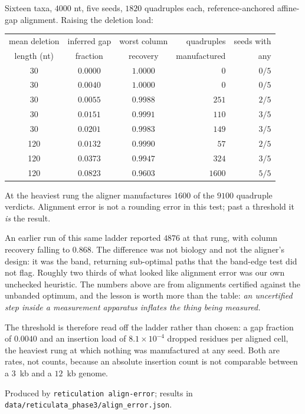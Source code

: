 \begin{numerics}
Sixteen taxa, $4000$ nt, five seeds, $1820$ quadruples each, reference-anchored
affine-gap alignment. Raising the deletion load:

\begin{center}\small
\begin{tabular}{@{}cccrr@{}}
\toprule
mean deletion & inferred gap & worst column & quadruples & seeds with \\
length (nt) & fraction & recovery & manufactured & any \\
\midrule
 30 & $0.0000$ & $1.0000$ & $0$    & $0/5$ \\
 30 & $0.0040$ & $1.0000$ & $0$    & $0/5$ \\
 30 & $0.0055$ & $0.9988$ & $251$  & $2/5$ \\
 30 & $0.0151$ & $0.9991$ & $110$  & $3/5$ \\
 30 & $0.0201$ & $0.9983$ & $149$  & $3/5$ \\
120 & $0.0132$ & $0.9990$ & $57$   & $2/5$ \\
120 & $0.0373$ & $0.9947$ & $324$  & $3/5$ \\
120 & $0.0823$ & $0.9603$ & $1600$ & $5/5$ \\
\bottomrule
\end{tabular}
\end{center}

At the heaviest rung the aligner manufactures $1600$ of the $9100$ quadruple
verdicts. Alignment error is not a rounding error in this test; past a
threshold it \emph{is} the result.

An earlier run of this same ladder reported $4876$ at that rung, with column
recovery falling to $0.868$. The difference was not biology and not the
aligner's design: it was the band, returning sub-optimal paths that the
band-edge test did not flag. Roughly two thirds of what looked like alignment
error was our own unchecked heuristic. The numbers above are from alignments
certified against the unbanded optimum, and the lesson is worth more than the
table: \emph{an uncertified step inside a measurement apparatus inflates the
thing being measured.}

The threshold is therefore read off the ladder rather than chosen: a gap
fraction of $0.0040$ and an insertion load of $8.1\times10^{-4}$ dropped
residues per aligned cell, the heaviest rung at which nothing was manufactured
at any seed. Both are rates, not counts, because an absolute insertion count is
not comparable between a $3$~kb and a $12$~kb genome.

Produced by \texttt{reticulation align-error}; results in
\texttt{data/reticulata\_phase3/align\_error.json}.
\end{numerics}

